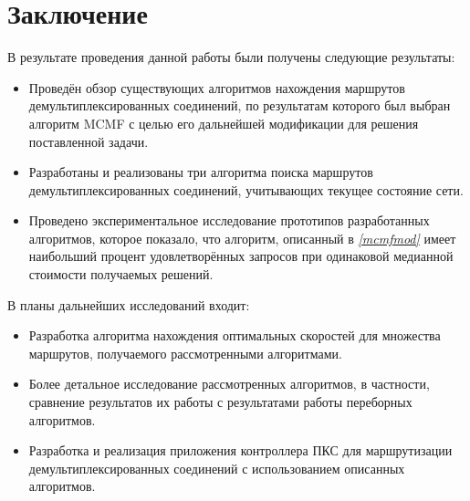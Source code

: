 \documentclass[a4paper]{article}
\begin{document}
\newpage
\section{Заключение}
В результате проведения данной работы были получены следующие результаты:
\begin{itemize}
\item Проведён обзор существующих алгоритмов нахождения маршрутов демультиплексированных соединений, по результатам которого был выбран алгоритм MCMF с целью его дальнейшей модификации для решения поставленной задачи.
\item Разработаны и реализованы три алгоритма поиска маршрутов демультиплексированных соединений, учитывающих текущее состояние сети.
\item Проведено экспериментальное исследование прототипов разработанных алгоритмов, которое показало, что алгоритм, описанный в \textit{\ref{mcmfmod}} имеет наибольший процент удовлетворённых запросов при одинаковой медианной стоимости получаемых решений.
\end{itemize}

В планы дальнейших исследований входит:
\begin{itemize}
\item Разработка алгоритма нахождения оптимальных скоростей для множества маршрутов, получаемого рассмотренными алгоритмами.
\item Более детальное исследование рассмотренных алгоритмов, в частности, сравнение результатов их работы с результатами работы переборных алгоритмов.
\item Разработка и реализация приложения контроллера ПКС для маршрутизации демультиплексированных соединений с использованием описанных алгоритмов.
\end{itemize}
\end{document}
